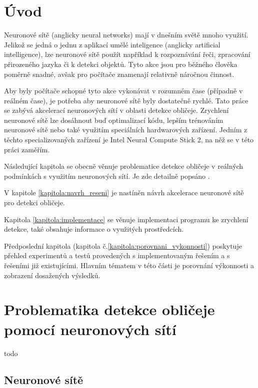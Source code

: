 \chapter{Úvod}
Neuronové sítě (anglicky neural networks) mají v dnešním světě mnoho využití. Jelikož se jedná o jednu z aplikací umělé inteligence (anglicky artificial intelligence), lze neuronové sítě použít například k rozpoznávání řeči, zpracování přirozeného jazyka či k detekci objektů.
Tyto akce jsou pro běžného člověka poměrně snadné, avšak pro počítače znamenají relativně náročnou činnost.

Aby byly počítače schopné tyto akce vykonávat v rozumném čase (případně v reálném čase), je potřeba aby neuronové sítě byly dostatečně rychlé. Tato práce se zabývá akcelerací neuronových sítí v oblasti detekce obličeje. Zrychlení neuronové sítě lze dosáhnout buď optimalizací kódu, lepším trénováním neuronové sítě nebo také využitím speciálních hardwarových zařízení. Jedním z těchto specializovaných zařízení je Intel Neural Compute Stick 2, na něž se v této práci zaměřím. 

Následující kapitola se obecně věnuje problematice detekce obličeje v reálných podmínkách s využitím neuronových sítí. Je zde detailně popsáno .

V kapitole \ref{kapitola:navrh_reseni} je nastíněn návrh akcelerace neuronové sítě pro detekci obličeje. \todo{\blindtext}

Kapitola \ref{kapitola:implementace} se věnuje implementaci programu ke zrychlení detekce, také obsahuje informace o využitých prostředcích.

Předposlední kapitola (kapitola č.\ref{kapitola:porovnani_vykonnosti}) poskytuje přehled experimentů a testů provedených s implementovaným řešením a s řešeními již existujícími. Hlavním tématem v této části je porovnání výkonnosti a zobrazení dosažených výsledků.

\nocite{*}

\chapter{Problematika detekce obličeje pomocí neuronových sítí}
\label{kapitola:problematika_detekce}
\todo{\blindtext}
todo

\section{Neuronové sítě}
\todo{\blindtext}

